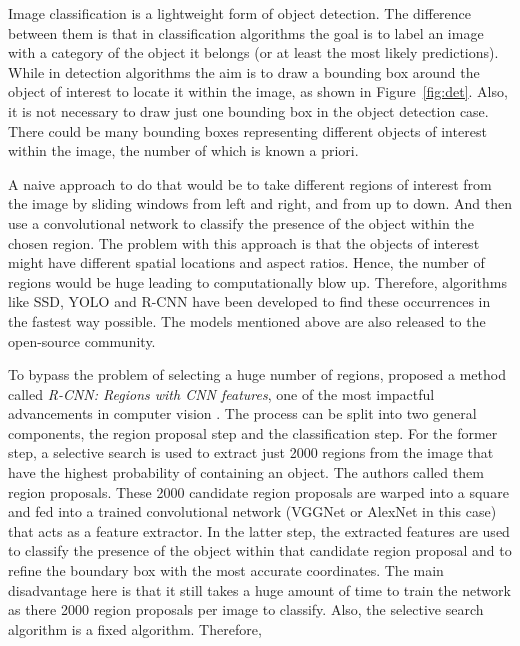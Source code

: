 \documentclass[12pt,a4paper,table,dvipsnames,tikz]{report}
\newcommand{\term}{\textit}
\newcommand{\acronym}{\MakeUppercase}
\newcommand{\bl}[1]{{\hypersetup{linkcolor=blue}#1}}
\begin{document}
	Image classification is a lightweight form of object detection. The difference between 
	them is that in classification algorithms the goal is to label an image with a category 
	of the object it belongs (or at least the most likely predictions). While in detection 
	algorithms the aim is to draw a bounding box around the object of interest to locate it 
	within the image, as shown in Figure~\bl{\ref{fig:det}}. Also, it is not necessary to draw 
	just one bounding box in the object detection case. There could be many bounding boxes 
	representing different objects of interest within the image, the number of which is 
	known a priori.
	\par
	A naive approach to do that would be to take different regions of interest from the 
	image by sliding windows from left and right, and from up to down. And then use a 
	convolutional network to classify the presence of the object within the chosen region. 
	The problem with this approach is that the objects of interest might have different 
	spatial locations and aspect ratios. Hence, the number of regions would be huge leading 
	to computationally blow up. Therefore, algorithms like \acronym{ssd}, \acronym{yolo} 
	and \acronym{r-cnn} \citep{Girshick, Redmon, Liu} have been developed to find these 
	occurrences in the fastest way possible. The models mentioned above are also released 
	to the open-source community.
	\par
	To bypass the problem of selecting a huge number of regions, \citet{Girshick} proposed 
	a method called \term{\acronym{r-cnn}: Regions with \acronym{cnn} features}, one of the 
	most impactful advancements in computer vision \citep{Deshpande}. The process can be 
	split into two general components, the region proposal step and the classification step. 
	For the former step, a selective search \citep{Uijlings} is used to extract just 2000 
	regions from the image that have the highest probability of containing an object. The 
	authors called them region proposals. These 2000 candidate region proposals are warped 
	into a square and fed into a trained convolutional network (VGGNet or AlexNet in this case) 
	that acts as a feature extractor. In the latter step, the extracted features are used to 
	classify the presence of the object within that candidate region proposal and to refine 
	the boundary box with the most accurate coordinates. The main disadvantage here is that 
	it still takes a huge amount of time to train the network as there 2000 region proposals 
	per image to classify. Also, the selective search algorithm is a fixed algorithm. Therefore, 
\end{document}

